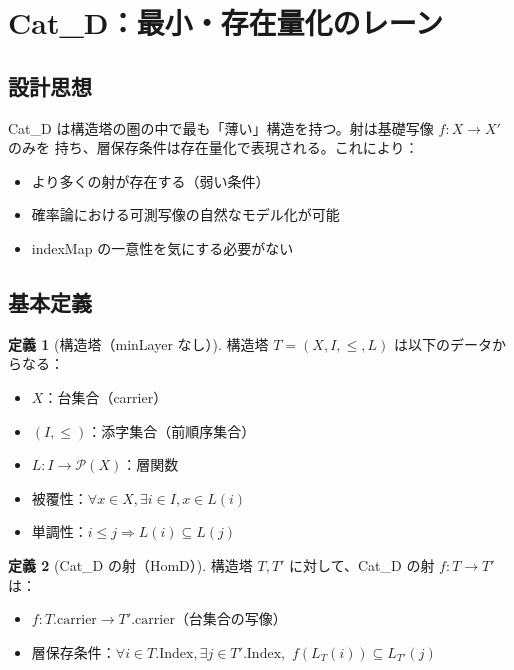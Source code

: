\documentclass{ltjsarticle}
\theoremstyle{definition}
\newtheorem{definition}{定義}[section]
\begin{document}
\section{Cat\_D：最小・存在量化のレーン}
\label{sec:cat-d}

\subsection{設計思想}

Cat\_D は構造塔の圏の中で最も「薄い」構造を持つ。射は基礎写像 $f: X \to X'$ のみを
持ち、層保存条件は存在量化で表現される。これにより：

\begin{itemize}
  \item より多くの射が存在する（弱い条件）
  \item 確率論における可測写像の自然なモデル化が可能
  \item indexMap の一意性を気にする必要がない
\end{itemize}

\subsection{基本定義}

\begin{definition}[構造塔（minLayer なし）]
構造塔 $T = (X, I, \leq, L)$ は以下のデータからなる：
\begin{itemize}
  \item $X$：台集合（carrier）
  \item $(I, \leq)$：添字集合（前順序集合）
  \item $L: I \to \mathcal{P}(X)$：層関数
  \item 被覆性：$\forall x \in X, \exists i \in I, x \in L(i)$
  \item 単調性：$i \leq j \Rightarrow L(i) \subseteq L(j)$
\end{itemize}
\end{definition}

\begin{definition}[Cat\_D の射（HomD）]
構造塔 $T, T'$ に対して、Cat\_D の射 $f: T \to T'$ は：
\begin{itemize}
  \item $f: T.\mathrm{carrier} \to T'.\mathrm{carrier}$（台集合の写像）
  \item 層保存条件：$\forall i \in T.\mathrm{Index}, \exists j \in T'.\mathrm{Index},$
        $f(L_T(i)) \subseteq L_{T'}(j)$
\end{itemize}
\end{definition}
\end{document}

